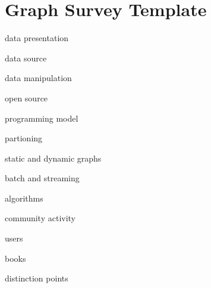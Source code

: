 \documentclass[UTF8,12pt,a4paper]{article}
\begin{document}
\section{Graph Survey Template}
\begin{compactitem}
  \item data presentation
  \item data source
  \item data manipulation
  \item open source
  \item programming model
  \item partioning
  \item static and dynamic graphs
  \item batch and streaming
  \item algorithms
  \item community activity
  \item users
  \item books 
  \item distinction points
\end{compactitem}
\clearpage



\newpage
\end{document}
